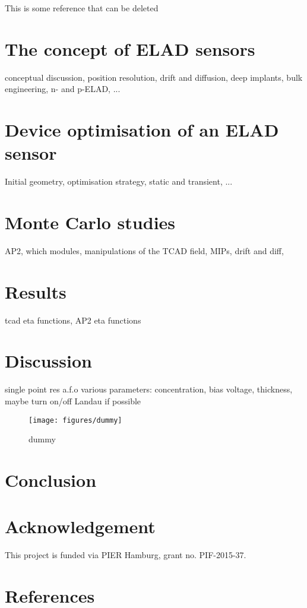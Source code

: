 \documentclass[preprint]{elsarticle}
\begin{document}
This is some reference that can be deleted~\cite{Moliere:1948zz,PhysRev.89.1256}

\section{The concept of ELAD sensors}

conceptual discussion, position resolution, drift and diffusion, deep implants, bulk engineering, n- and p-ELAD, ...

\section{Device optimisation of an ELAD sensor}

Initial geometry, optimisation strategy, static and transient, ...

\section{Monte Carlo studies}

AP2, which modules, manipulations of the TCAD field, MIPs, drift and diff, 

\section{Results}

tcad eta functions, AP2 eta functions

\section{Discussion}

single point res a.f.o various parameters: concentration, bias voltage, thickness, maybe turn on/off Landau if possible

\begin{figure}[t]
  \centering
  \texttt{[image: figures/dummy]} %
  \caption{dummy}
\label{fig:dummy}
\end{figure}

\section{Conclusion}


\section*{Acknowledgement}
This project is funded via PIER Hamburg, grant no. PIF-2015-37.

\small
\section*{References}


\end{document}
